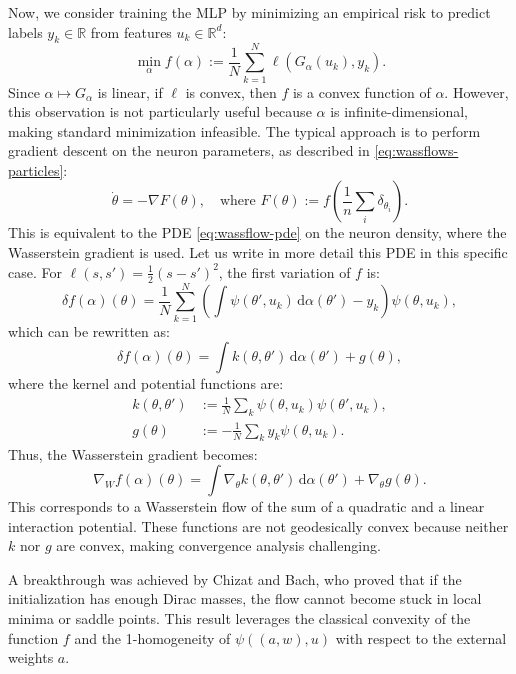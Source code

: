 Now, we consider training the MLP by minimizing an empirical risk to predict labels $y_k \in \mathbb{R}$ from features $u_k \in \mathbb{R}^d$:
\begin{equation*}
    \min_\alpha f(\alpha) := \frac{1}{N} \sum_{k=1}^N \ell(G_\alpha(u_k), y_k).
\end{equation*}
Since $\alpha \mapsto G_\alpha$ is linear, if $\ell$ is convex, then $f$ is a convex function of $\alpha$. However, this observation is not particularly useful because $\alpha$ is infinite-dimensional, making standard minimization infeasible. The typical approach is to perform gradient descent on the neuron parameters, as described in \eqref{eq:wassflows-particles}:
\begin{equation*}
    \dot{\theta} = -\nabla F(\theta), \quad \text{where } F(\theta) := f\left(\frac{1}{n} \sum_i \delta_{\theta_i}\right).
\end{equation*}
This is equivalent to the PDE \eqref{eq:wassflow-pde} on the neuron density, where the Wasserstein gradient is used.
%
Let us write in more detail this PDE in this specific case. 
For $\ell(s, s') = \frac{1}{2}(s - s')^2$, the first variation of $f$ is:
\begin{equation*}
    \delta f(\alpha)(\theta) = \frac{1}{N} \sum_{k=1}^N \left(\int \psi(\theta', u_k) \, \mathrm{d} \alpha(\theta') - y_k\right) \psi(\theta, u_k),
\end{equation*}
which can be rewritten as:
\begin{equation*}
    \delta f(\alpha)(\theta) = \int k(\theta, \theta') \, \mathrm{d} \alpha(\theta') + g(\theta),
\end{equation*}
where the kernel and potential functions are:
\begin{align}
    k(\theta, \theta') &:= \frac{1}{N} \sum_k \psi(\theta, u_k) \psi(\theta', u_k), \\
    g(\theta) &:= -\frac{1}{N} \sum_k y_k \psi(\theta, u_k).
\end{align}
Thus, the Wasserstein gradient becomes:
\begin{equation*}
    \nabla_W f(\alpha)(\theta) = \int \nabla_\theta k(\theta, \theta') \, \mathrm{d} \alpha(\theta') + \nabla_\theta g(\theta).
\end{equation*}
This corresponds to a Wasserstein flow of the sum of a quadratic and a linear interaction potential. These functions are not geodesically convex because neither $k$ nor $g$ are convex, making convergence analysis challenging.

A breakthrough was achieved by Chizat and Bach, who proved that if the initialization has enough Dirac masses, the flow cannot become stuck in local minima or saddle points. This result leverages the classical convexity of the function $f$ and the 1-homogeneity of $\psi((a, w), u)$ with respect to the external weights $a$.

